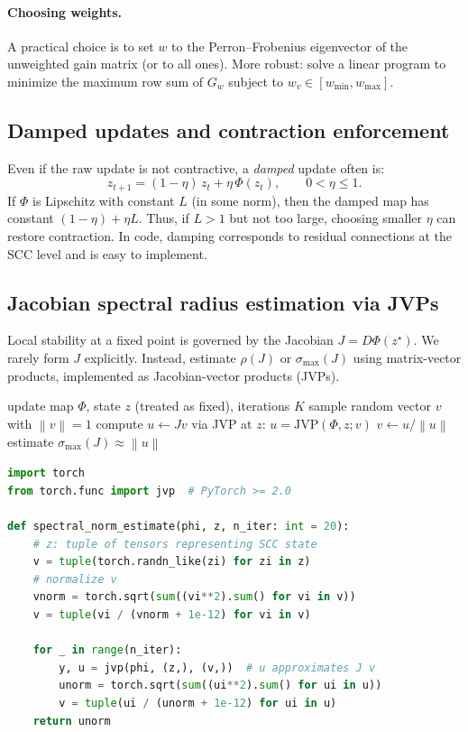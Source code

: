 \documentclass[11pt]{article}
\theoremstyle{definition}
\theoremstyle{plain}
\theoremstyle{remark}
\newcommand{\norm}[1]{\left\lVert #1 \right\rVert}
\begin{document}
\paragraph{Choosing weights.}
A practical choice is to set $w$ to the Perron--Frobenius eigenvector of the unweighted gain matrix (or to all ones).
More robust: solve a linear program to minimize the maximum row sum of $G_w$ subject to $w_v\in[w_{\min},w_{\max}]$.

\subsection{Damped updates and contraction enforcement}
Even if the raw update is not contractive, a \emph{damped} update often is:
\[
z_{t+1} = (1-\eta)\,z_t + \eta\,\Phi(z_t),\qquad 0<\eta\le 1.
\]
If $\Phi$ is Lipschitz with constant $L$ (in some norm), then the damped map has constant $(1-\eta)+\eta L$.
Thus, if $L>1$ but not too large, choosing smaller $\eta$ can restore contraction.
In code, damping corresponds to residual connections at the SCC level and is easy to implement.

\subsection{Jacobian spectral radius estimation via JVPs}
Local stability at a fixed point is governed by the Jacobian $J=D\Phi(z^\star)$.
We rarely form $J$ explicitly.
Instead, estimate $\rho(J)$ or $\sigma_{\max}(J)$ using matrix-vector products, implemented as Jacobian-vector products (JVPs).

\begin{algorithm}[t]
\caption{Estimate $\sigma_{\max}(J)$ of a cyclic SCC update via power iteration}
\label{alg:power-jacobian}
\begin{algorithmic}[1]
\Require update map $\Phi$, state $z$ (treated as fixed), iterations $K$
\State sample random vector $v$ with $\norm{v}=1$
  \State compute $u \gets J v$ via JVP at $z$: $u=\mathrm{JVP}(\Phi,z;v)$
  \State $v \gets u / \norm{u}$
\EndFor
\State \Return estimate $\sigma_{\max}(J)\approx \norm{u}$
\end{algorithmic}
\end{algorithm}

\begin{lstlisting}[language=Python,caption={PyTorch snippet for Jacobian-vector power iteration on an implicit SCC update.},label={lst:jvp}]
import torch
from torch.func import jvp  # PyTorch >= 2.0

def spectral_norm_estimate(phi, z, n_iter: int = 20):
    # z: tuple of tensors representing SCC state
    v = tuple(torch.randn_like(zi) for zi in z)
    # normalize v
    vnorm = torch.sqrt(sum((vi**2).sum() for vi in v))
    v = tuple(vi / (vnorm + 1e-12) for vi in v)

    for _ in range(n_iter):
        y, u = jvp(phi, (z,), (v,))  # u approximates J v
        unorm = torch.sqrt(sum((ui**2).sum() for ui in u))
        v = tuple(ui / (unorm + 1e-12) for ui in u)
    return unorm
\end{lstlisting}
\end{document}
